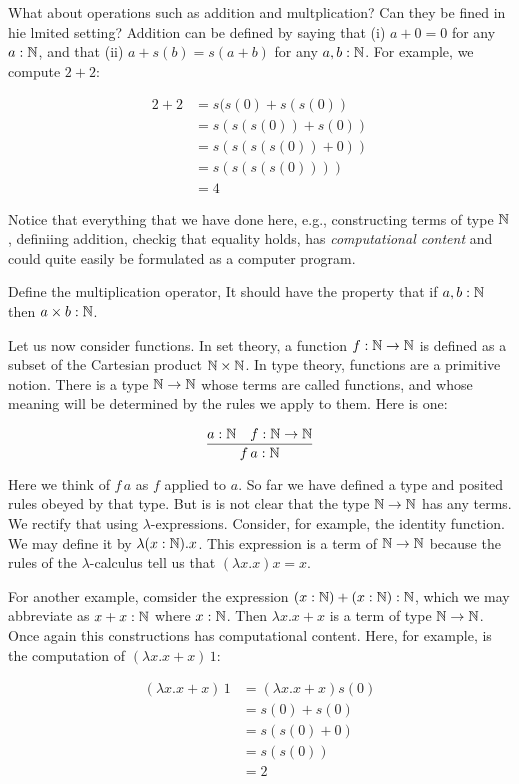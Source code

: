 What about operations such as addition and multplication?  Can they be fined in hie lmited setting?
Addition can be defined by saying that (i) $a + 0 = 0$ for any $a:\mathbb{N}$, and that (ii) $a + s(b) = s(a + b)$ for any $a,b:\mathbb{N}$.  For example, we compute $2 + 2$:

\begin{align}
2 + 2 &= s(s(0) + s(s(0))\\
  &= s(s(s(0)) + s(0)) \\
  &= s(s(s(s(0)) + 0)) \\
  &= s(s(s(s(0)))) \\
  &= 4
\end{align}


Notice that everything that we have done here, e.g., constructing terms of type $\mathbb{N}$, definiing addition, checkig that equality holds, has \emph{computational content} and could quite easily be formulated as a computer program.


 Define the multiplication operator,  It should have the property that if $a, b : \mathbb{N}$ then $a \times b : \mathbb{N}$.

Let us now consider functions.  In set theory, a function $f: \mathbb{N} \to \mathbb{N}$ is defined as a subset of the Cartesian product $\mathbb{N} \times \mathbb{N}$.  In type theory, functions are a primitive notion.  There is a type $\mathbb{N} \to \mathbb{N}$ whose terms are called functions, and whose meaning will be determined by the rules we apply to them.   Here is one:

$$
\frac{a : \mathbb{N} \quad f : \mathbb{N} \to \mathbb{N}}{f\, a : \mathbb{N}}
$$

Here we think of $f\, a$ as $f$ applied to $a$.  So far we have defined a type and posited rules obeyed by that type.  But is is not clear that  the type $\mathbb{N} \to \mathbb{N}$ has any terms.  We rectify that using $\lambda$-expressions.
Consider, for example, the identity function.  We may define it by  $\lambda (x:\mathbb{N}).x$.  This expression is a term of $\mathbb{N} \to \mathbb{N}$ because the rules of the $\lambda$-calculus tell us that $(\lambda x.x) x = x$.


For another example, comsider the expression $(x:\mathbb{N}) + (x:\mathbb{N}):\mathbb{N}$, which we may abbreviate as $x + x: \mathbb{N}$ where $x: \mathbb{N}$.  Then $\lambda x. x + x$ is a term of type $\mathbb{N} \to \mathbb{N}$. Once again this constructions has computational content.  Here, for example, is the computation of $(\lambda x.x + x)\,1$:

\begin{align}
(\lambda x.x + x) \,1 &= (\lambda x.x + x) s(0) \\
&=  s(0) + s(0) \\
&= s(s(0) + 0)\\
&= s(s(0)) \\
&= 2 \\
\end{align}

